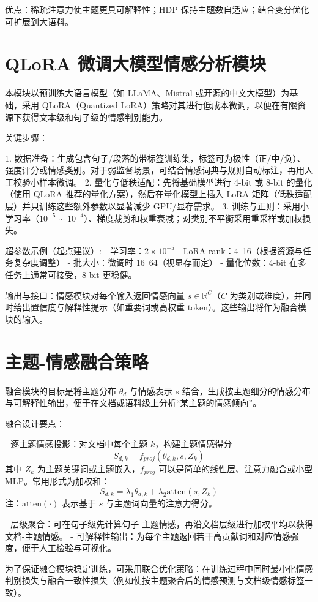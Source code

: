 优点：稀疏注意力使主题更具可解释性；HDP 保持主题数自适应；结合变分优化可扩展到大语料。

\section{QLoRA 微调大模型情感分析模块}
\label{sec:qlora_module}
本模块以预训练大语言模型（如 LLaMA、Mistral 或开源的中文大模型）为基础，采用 QLoRA（Quantized LoRA）策略对其进行低成本微调，以便在有限资源下获得文本级和句子级的情感判别能力。

关键步骤：

1. 数据准备：生成包含句子/段落的带标签训练集，标签可为极性（正/中/负）、强度评分或情感类别。对于弱监督场景，可结合情感词典与规则自动标注，再用人工校验小样本微调。
2. 量化与低秩适配：先将基础模型进行 4-bit 或 8-bit 的量化（使用 QLoRA 推荐的量化方案），然后在量化模型上插入 LoRA 矩阵（低秩适配层）并只训练这些额外参数以显著减少 GPU/显存需求。
3. 训练与正则：采用小学习率（$10^{-5}\sim10^{-4}$）、梯度裁剪和权重衰减；对类别不平衡采用重采样或加权损失。

超参数示例（起点建议）:
- 学习率：$2\times10^{-5}$
- LoRA rank：4~16（根据资源与任务复杂度调整）
- 批大小：微调时 16~64（视显存而定）
- 量化位数：4-bit 在多任务上通常可接受，8-bit 更稳健。

输出与接口：情感模块对每个输入返回情感向量 $s\in\mathbb{R}^C$（$C$ 为类别或维度），并同时给出置信度与解释性提示（如重要词或高权重 token）。这些输出将作为融合模块的输入。

\section{主题-情感融合策略}
\label{sec:fusion}
融合模块的目标是将主题分布 $\theta_d$ 与情感表示 $s$ 结合，生成按主题细分的情感分布与可解释性输出，便于在文档或语料级上分析“某主题的情感倾向”。

融合设计要点：

- 逐主题情感投影：对文档中每个主题 $k$，构建主题情感得分
$$S_{d,k}=f_{proj}(\theta_{d,k}, s, Z_k)$$
其中 $Z_k$ 为主题关键词或主题嵌入，$f_{proj}$ 可以是简单的线性层、注意力融合或小型 MLP。常用形式为加权和：
$$S_{d,k}=\lambda_1\theta_{d,k}+\lambda_2\mathrm{atten}(s, Z_k)$$
注：$\mathrm{atten}(\cdot)$ 表示基于 $s$ 与主题词向量的注意力得分。

- 层级聚合：可在句子级先计算句子-主题情感，再沿文档层级进行加权平均以获得文档-主题情感。
- 可解释性输出：为每个主题返回若干高贡献词和对应情感强度，便于人工检验与可视化。

为了保证融合模块稳定训练，可采用联合优化策略：在训练过程中同时最小化情感判别损失与融合一致性损失（例如使按主题聚合后的情感预测与文档级情感标签一致）。

